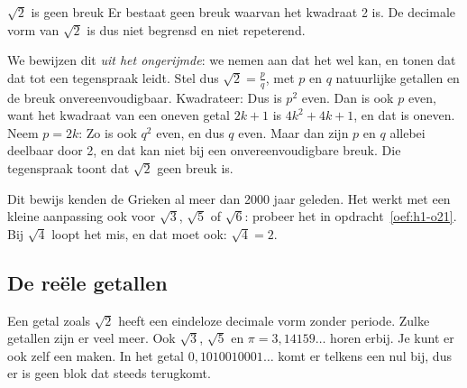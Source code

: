 \begin{theorie}
\begin{stelling}{$\sqrt2$ is geen breuk}
Er bestaat geen breuk waarvan het kwadraat 2 is. De decimale vorm van $\sqrt2$ is dus niet begrensd en niet repeterend.
\end{stelling}

\begin{bewijs}
We bewijzen dit \textit{uit het ongerijmde}: we nemen aan dat het wel kan, en tonen dat dat tot een tegenspraak leidt. Stel dus $\sqrt2 = \tfrac pq$, met $p$ en $q$ natuurlijke getallen en de breuk onvereenvoudigbaar. Kwadrateer:
Dus is $p^2$ even. Dan is ook $p$ even, want het kwadraat van een oneven getal $2k + 1$ is $4k^2 + 4k + 1$, en dat is oneven. Neem $p = 2k$:
Zo is ook $q^2$ even, en dus $q$ even. Maar dan zijn $p$ en $q$ allebei deelbaar door 2, en dat kan niet bij een onvereenvoudigbare breuk. Die tegenspraak toont dat $\sqrt2$ geen breuk is.
\end{bewijs}
\end{theorie}

Dit bewijs kenden de Grieken al meer dan 2000 jaar geleden. Het werkt met een kleine aanpassing ook voor $\sqrt3$, $\sqrt5$ of $\sqrt6$: probeer het in opdracht~\ref{oef:h1-o21}. Bij $\sqrt4$ loopt het mis, en dat moet ook: $\sqrt4 = 2$.

\subsection{De reële getallen}

Een getal zoals $\sqrt2$ heeft een eindeloze decimale vorm zonder periode. Zulke getallen zijn er veel meer. Ook $\sqrt3$, $\sqrt5$ en $\pi = 3,14159\ldots$ horen erbij. Je kunt er ook zelf een maken. In het getal $0,1010010001\ldots$ komt er telkens een nul bij, dus er is geen blok dat steeds terugkomt.

